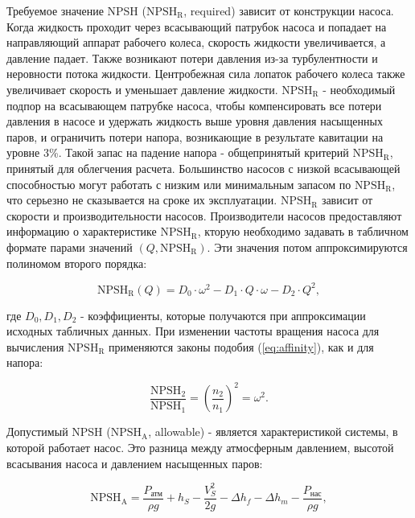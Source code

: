 \documentclass[a4paper, 12pt]{article}
\begin{document}
Требуемое значение NPSH ($\text{NPSH}{_\text{R}}$, required) зависит от конструкции насоса. Когда жидкость проходит через всасывающий патрубок насоса и попадает на направляющий аппарат рабочего колеса, скорость жидкости увеличивается, а давление падает. Также возникают потери давления из-за турбулентности и неровности потока жидкости. Центробежная сила лопаток рабочего колеса также увеличивает скорость и уменьшает давление жидкости. $\text{NPSH}{_\text{R}}$ - необходимый подпор на всасывающем патрубке насоса, чтобы компенсировать все потери давления в насосе и удержать жидкость выше уровня давления насыщенных паров, и ограничить потери напора, возникающие в результате кавитации на уровне 3\%. Такой запас на падение напора - общепринятый критерий $\text{NPSH}{_\text{R}}$, принятый для облегчения расчета. Большинство насосов с низкой всасывающей способностью могут работать с низким или минимальным запасом по $\text{NPSH}{_\text{R}}$, что серьезно не сказывается на сроке их эксплуатации. $\text{NPSH}{_\text{R}}$ зависит от скорости и производительности насосов. Производители насосов предоставляют информацию о характеристике $\text{NPSH}{_\text{R}}$, кторую необходимо задавать в табличном формате парами значений \((Q, \text{NPSH}{_\text{R}})\). Эти значения потом аппроксимируются полиномом второго порядка:

\begin{equation}\label{eq:NPSH_curve}
	\text{NPSH}{_\text{R}}(Q) = D_0 \cdot \omega^2 - D_1 \cdot Q \cdot \omega - D_2 \cdot Q^2,
\end{equation}

\noindent где $D_0, D_1, D_2$ - коэффициенты, которые получаются при аппроксимации исходных табличных данных. При изменении частоты вращения насоса для вычисления $\text{NPSH}{_\text{R}}$ применяются законы подобия (\ref{eq:affinity}), как и для напора:

\begin{equation}\label{eq:affinity1}
	\frac{\text{NPSH}_2}{\text{NPSH}_1} = \left(\frac{n_2}{n_1}\right)^2 = \omega^2.
\end{equation}

Допустимый NPSH ($\text{NPSH}{_\text{A}}$, allowable) - является характеристикой системы, в которой работает насос. Это разница между атмосферным давлением, высотой всасывания насоса и давлением насыщенных паров:

\begin{equation}
	\text{NPSH}{_\text{A}} = \frac{P_{\text{атм}}}{\rho g} + h_S - \frac{V_S^2}{2g} - \Delta h_f - \Delta h_m - \frac{P_{\text{нас}}}{\rho g} ,
\end{equation}
\end{document}
